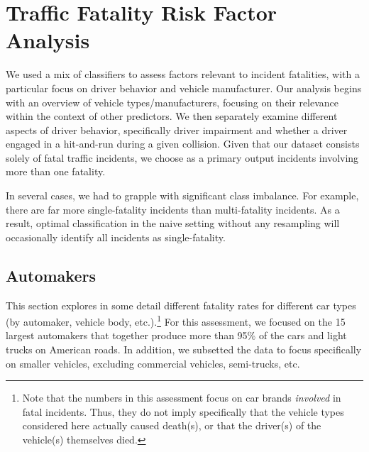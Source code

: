 \documentclass[11pt, oneside,titlepage]{article}   	%
\begin{document}
\section*{Traffic Fatality Risk Factor Analysis}
We used a mix of classifiers to assess factors relevant to incident fatalities, with a particular focus on driver behavior and vehicle manufacturer. Our analysis begins with an overview of vehicle types/manufacturers, focusing on their relevance within the context of other predictors. We then separately examine different aspects of driver behavior, specifically driver impairment and whether a driver engaged in a hit-and-run during a given collision. Given that our dataset consists solely of fatal traffic incidents, we choose as a primary output incidents involving more than one fatality.

In several cases, we had to grapple with significant class imbalance. For example, there are far more single-fatality incidents than multi-fatality incidents. As a result, optimal classification in the naive setting without any resampling will occasionally identify all incidents as single-fatality.   

\subsection*{Automakers}

This section explores in some detail different fatality rates for different car types (by automaker, vehicle body, etc.).\footnote{Note that the numbers in this assessment focus on car brands \textit{involved} in fatal incidents. Thus, they do not imply specifically that the vehicle types considered here actually caused death(s), or that the driver(s) of the vehicle(s) themselves died.} For this assessment, we focused on the 15 largest automakers that together produce more than 95\% of the cars and light trucks on American roads. In addition, we subsetted the data to focus specifically on smaller vehicles, excluding commercial vehicles, semi-trucks, etc. \\
\end{document}
